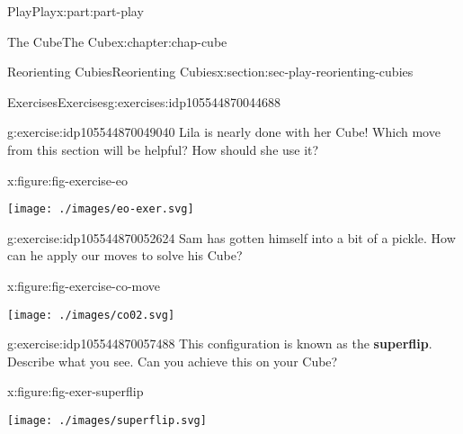 \documentclass[oneside,10pt,]{book}
\newcommand{\terminology}[1]{\textbf{#1}}
\numberwithin{equation}{section}
\begin{document}
\begin{partptx}{Play}{}{Play}{}{}{x:part:part-play}
\begin{chapterptx}{The Cube}{}{The Cube}{}{}{x:chapter:chap-cube}
\begin{sectionptx}{Reorienting Cubies}{}{Reorienting Cubies}{}{}{x:section:sec-play-reorienting-cubies}
\begin{exercises-subsection-numberless}{Exercises}{}{Exercises}{}{}{g:exercises:idp105544870044688}
\begin{divisionexercise}{2}{}{}{g:exercise:idp105544870049040}
Lila is nearly done with her Cube! Which move from this section will be helpful? How should she use it?%
\begin{figureptx}{}{x:figure:fig-exercise-eo}{}%
\begin{image}{0.25}{0.5}{0.25}%
\texttt{[image: ./images/eo-exer.svg]}
\end{image}%
\tcblower
\end{figureptx}%
\end{divisionexercise}%
\begin{divisionexercise}{3}{}{}{g:exercise:idp105544870052624}%
Sam has gotten himself into a bit of a pickle. How can he apply our moves to solve his Cube?%
\begin{figureptx}{}{x:figure:fig-exercise-co-move}{}%
\begin{image}{0.25}{0.5}{0.25}%
\texttt{[image: ./images/co02.svg]}
\end{image}%
\tcblower
\end{figureptx}%
\end{divisionexercise}%
\begin{divisionexercise}{4}{}{}{g:exercise:idp105544870057488}%
This configuration is known as the \terminology{superflip}. Describe what you see. Can you achieve this on your Cube?%
\begin{figureptx}{}{x:figure:fig-exer-superflip}{}%
\begin{image}{0.25}{0.5}{0.25}%
\texttt{[image: ./images/superflip.svg]}
\end{image}%
\tcblower
\end{figureptx}%
\end{divisionexercise}%
\end{exercises-subsection-numberless}
\end{sectionptx}
\end{chapterptx}
\end{partptx}
%
%
\typeout{************************************************}
\typeout{************************************************}
%
\end{document}
